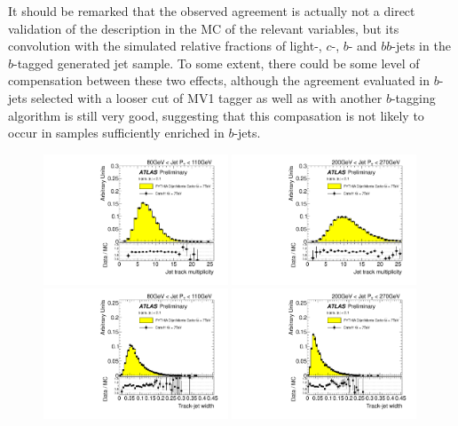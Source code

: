 It should be remarked that the observed agreement is actually not a direct validation of the description in the MC of the relevant variables, but its convolution with the simulated relative fractions of light-, $c$-, $b$- and $bb$-jets in the $b$-tagged generated jet sample. To some extent, there could be some level of compensation between these two effects, although the agreement evaluated in $b$-jets selected with a looser cut of MV1 tagger as well as with another $b$-tagging algorithm is still very good, suggesting that this compasation is not likely to occur in samples sufficiently enriched in $b$-jets.


\begin{figure}[tp]
\centering
\includegraphics[width=0.49\textwidth]{FIGS/dataMC/FullDataVarNtrkPT080.pdf}
\includegraphics[width=0.49\textwidth]{FIGS/dataMC/FullDataVarNtrkPT200.pdf}
\includegraphics[width=0.49\textwidth]{FIGS/dataMC/FullDataVarTrkWidthPT080.pdf}
\includegraphics[width=0.49\textwidth]{FIGS/dataMC/FullDataVarTrkWidthPT200.pdf}  

\end{figure}
